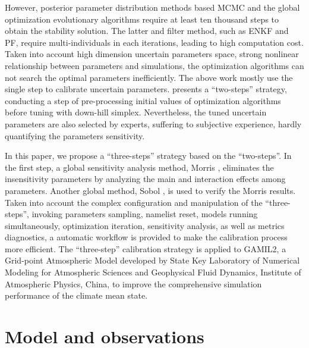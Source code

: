\documentclass[gmd, manuscript]{copernicus}
\begin{document}
However, posterior parameter distribution methods based MCMC and the global optimization
evolutionary algorithms require at least ten thousand steps to obtain the stability solution. The
latter and filter method, such as ENKF and PF, require multi-individuals in each iterations,
leading to high computation cost. Taken into account high dimension uncertain parameters space,
strong nonlinear relationship between parameters and simulations, the optimization algorithms can
not search the optimal parameters inefficiently. The above work mostly use the single step to
calibrate uncertain parameters. \cite{zhang2014quantification} presents a ``two-steps'' strategy,
conducting a step of pre-processing initial values of optimization algorithms before tuning with
down-hill simplex. Nevertheless, the tuned uncertain parameters are also selected by experts,
suffering to subjective experience, hardly quantifying the parameters sensitivity.

In this paper, we propose a ``three-steps'' strategy based on the ``two-steps''. In the first step,
a global sensitivity analysis method, Morris \citep{morris1991factorial,campolongo2007effective},
eliminates the insensitivity parameters by analyzing  the main and interaction effects among
parameters. Another global method, Sobol \citep{sobol2001global}, is used to verify the Morris
results. Taken into account the complex configuration and manipulation of the ``three-steps'',
invoking parameters sampling, namelist reset, models running simultaneously, optimization
iteration, sensitivity analysis, as well as metrics diagnostics, a automatic workflow is provided
to make the calibration process more efficient. The ``three-step'' calibration strategy is applied
to GAMIL2,  a Grid-point Atmospheric Model developed by State Key Laboratory of Numerical Modeling
for Atmospheric Sciences and Geophysical Fluid Dynamics, Institute of Atmospheric Physics, China,
to improve the comprehensive simulation performance of the climate mean state.


\section{Model and observations} 
\end{document}
